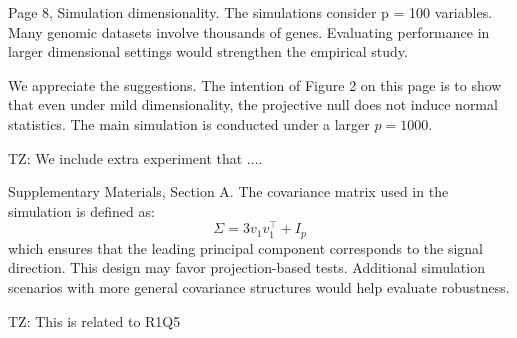 \documentclass{article}
\theoremstyle{definition}
\newcommand{\tz}{\color{teal} TZ: }
\begin{document}
\begin{shaded}
Page 8, Simulation dimensionality.
The simulations consider p = 100 variables. Many genomic datasets involve thousands of genes. Evaluating performance in larger dimensional settings would strengthen the empirical study.
\end{shaded}

We appreciate the suggestions. The intention of Figure 2 on this page is to show that even under mild dimensionality, the projective null does not induce normal statistics. The main simulation is conducted under a larger $p = 1000$.

{\tz We include extra experiment that ....}

\begin{shaded}
Supplementary Materials, Section A.
The covariance matrix used in the simulation is defined as:
$$
\Sigma = 3v_1 v_1^\top + I_p
$$
which ensures that the leading principal component corresponds to the signal direction. This design may favor projection-based tests. Additional simulation scenarios with more general covariance structures would help evaluate robustness.  
\end{shaded}

{\tz This is related to R1Q5}



\end{document}
